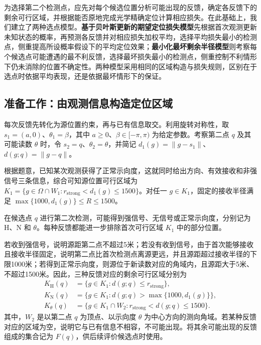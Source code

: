 \documentclass[UTF8,a4paper,zihao=-4,fontset=none]{ctexart}
\begin{document}
为选择第二个检测点，应先对每个候选位置分析可能出现的反馈，确定各反馈下的剩余可行区域，并根据能否原地完成光学精确定位计算相应损失。在此基础上，我们建立了两种选点模型。\textbf{基于贝叶斯更新的期望定位损失模型}先根据首次观测更新未知状态的概率，再预测各反馈并对相应损失加权平均，选择平均损失最小的检测点，侧重提高所设概率假设下的平均定位效果；\textbf{最小化最坏剩余半径模型}则考察每个候选点可能遭遇的最不利反馈，选择最坏损失最小的检测点，侧重控制不利情形下仍未消除的位置不确定性。两种模型采用相同的区域构造与损失规则，区别在于选点时依据平均表现，还是依据最坏情形下的保证。

\subsection{准备工作：由观测信息构造定位区域}

每次反馈先转化为源位置约束，再与已有信息取交。利用旋转对称性，取 \(s_1=(a,0)\)、\(\theta_1=\beta\)，其中 \(a\ge0\)、\(\beta\in[-\pi,\pi)\) 为给定参数。考察第二点 \(q\) 及其可能读数 \(\theta\) 时，令 \(s_2=q\)、\(\theta_2=\theta\)，并简记 \(d_1(g)=\|g-s_1\|\)、\(d(g;q)=\|g-q\|\)。

根据题意，已知某次观测获得了正常示向度，这就同时给出方向、有效接收和非强信号三条信息，综合可知源位置可行区域为 \(K_1=\{g\in\Omega\cap W_1:r_{\mathrm{strong}}<d_1(g)\le1500\}\)。对任一 \(g\in K_1\)，固定的接收半径满足 \(\max\{1000,d_1(g)\}\le R\le1500\)。

在候选点 \(q\) 进行第二次检测，可能得到强信号、无信号或正常示向度，分别记为 \(\mathrm H\)、\(\mathrm N\) 和 \(\theta\)。每种反馈都能进一步排除首次可行区域 \(K_1\) 中的部分位置。

若收到强信号，说明源距第二点不超过5米；若没有收到信号，由于首次能够接收且接收半径固定，说明第二点比首次检测点离源更远，并且源距超过接收半径的下限1000米；若得到正常示向度，则源位于新读数对应的角域内，且源距大于5米、不超过1500米。因此，三种反馈对应的剩余可行区域分别为
\begin{equation}
\begin{aligned}
K_{\mathrm H}(q)&=\{g\in K_1:d(g;q)\le r_{\mathrm{strong}}\},\\
K_{\mathrm N}(q)&=\{g\in K_1:d(g;q)>\max\{1000,d_1(g)\}\},\\
K_\theta(q)&=\{g\in K_1\cap W_2:r_{\mathrm{strong}}<d(g;q)\le1500\}.
\end{aligned}
\label{eq:q2-pair-regions}
\end{equation}
其中，\(W_2\) 是以第二点 \(q\) 为顶点、以示向度 \(\theta\) 为中心方向的测向角域。若某种反馈对应的区域为空，说明它与已有信息不相容，不可能出现。将其余可能出现的反馈组成的集合记为 \(F(q)\)，供后续评价候选点时使用。
\end{document}
